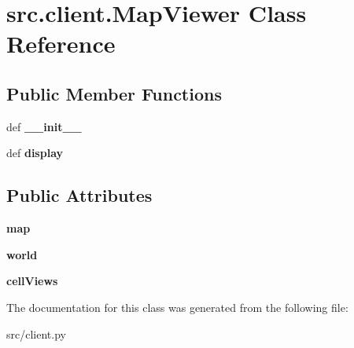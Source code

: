 \hypertarget{classsrc_1_1client_1_1_map_viewer}{\section{src.\-client.\-Map\-Viewer \-Class \-Reference}
\label{classsrc_1_1client_1_1_map_viewer}
}
\subsection*{\-Public \-Member \-Functions}
\begin{DoxyCompactItemize}
\item 
\hypertarget{classsrc_1_1client_1_1_map_viewer_a162c5427f229218b6c00b2eccf94695e}{def {\bfseries \-\_\-\-\_\-init\-\_\-\-\_\-}}\label{classsrc_1_1client_1_1_map_viewer_a162c5427f229218b6c00b2eccf94695e}

\item 
\hypertarget{classsrc_1_1client_1_1_map_viewer_a488d1f804bb6afb800f6c1f87d1c1f56}{def {\bfseries display}}\label{classsrc_1_1client_1_1_map_viewer_a488d1f804bb6afb800f6c1f87d1c1f56}

\end{DoxyCompactItemize}
\subsection*{\-Public \-Attributes}
\begin{DoxyCompactItemize}
\item 
\hypertarget{classsrc_1_1client_1_1_map_viewer_addc0dc8f2e1fa7833af134f54df72719}{{\bfseries map}}\label{classsrc_1_1client_1_1_map_viewer_addc0dc8f2e1fa7833af134f54df72719}

\item 
\hypertarget{classsrc_1_1client_1_1_map_viewer_aea05d4e373cebbc1e88241e692d3e6b4}{{\bfseries world}}\label{classsrc_1_1client_1_1_map_viewer_aea05d4e373cebbc1e88241e692d3e6b4}

\item 
\hypertarget{classsrc_1_1client_1_1_map_viewer_a9bea0ac08d333bc5ced0113a917d68e2}{{\bfseries cell\-Views}}\label{classsrc_1_1client_1_1_map_viewer_a9bea0ac08d333bc5ced0113a917d68e2}

\end{DoxyCompactItemize}


\-The documentation for this class was generated from the following file\-:\begin{DoxyCompactItemize}
\item 
src/client.\-py\end{DoxyCompactItemize}
